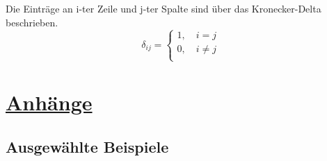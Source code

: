 \documentclass[12pt,a4paper]{article}%
\numberwithin{equation}{section}
\numberwithin{equation}{subsection}
\begin{document}
  Die Einträge an i-ter Zeile und j-ter Spalte sind über das Kronecker-Delta beschrieben.
  \begin{equation}
    \delta_{ij} = \begin{cases}
	    1,\quad i = j\\
	    0,\quad i\neq j\\
    \end{cases}
  \end{equation}
 
\newpage

\section{\underline{Anhänge}}
	\subsection{Ausgewählte Beispiele}
\end{document}
